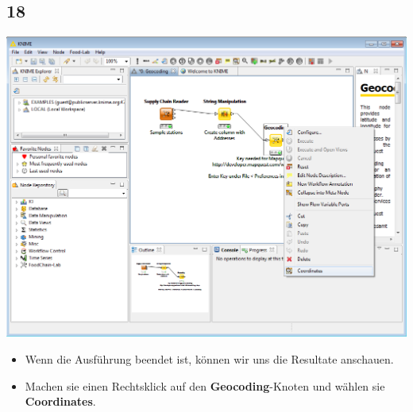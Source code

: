 \documentclass{beamer}
\begin{document}
\subsection{18}
\begin{frame}
	\begin{center}
  		\includegraphics[height=0.6\textheight]{18.png}
	\end{center}
	\begin{itemize}
		\item Wenn die Ausführung beendet ist, können wir uns die Resultate anschauen.
		\item Machen sie einen Rechtsklick auf den \textbf{Geocoding}-Knoten und wählen sie \textbf{Coordinates}.
	\end{itemize}
\end{frame}
\end{document}
